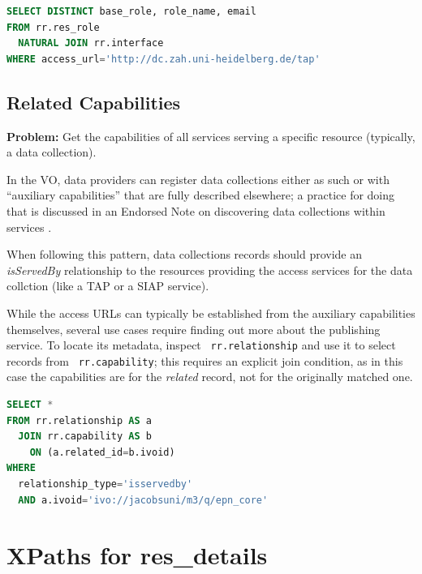 \documentclass[11pt,a4paper]{ivoa}
\newcommand{\rtent}[1]{\texttt{\color{rtcolor} #1}}
\begin{document}
\begin{lstlisting}[language=SQL,flexiblecolumns=true]
SELECT DISTINCT base_role, role_name, email 
FROM rr.res_role 
  NATURAL JOIN rr.interface 
WHERE access_url='http://dc.zah.uni-heidelberg.de/tap'
\end{lstlisting}

\subsection{Related Capabilities}

\textbf{Problem:} Get the capabilities of all services serving a
specific resource (typically, a data collection).

In the VO, data providers can register data collections either as such
or with ``auxiliary capabilities'' that are fully described elsewhere; a
practice for doing that is discussed in an Endorsed Note on discovering
data collections within services \citep{TODO}.

When following this pattern, data collections records should provide an
\emph{isServedBy} relationship to the resources providing the access
services for the data collction (like a TAP or a SIAP service).

While the access URLs can typically be established from the auxiliary
capabilities themselves, several use cases require finding out more
about the publishing service.  To locate its metadata, inspect
\rtent{rr.relationship} and use it to select records
from 
\rtent{rr.capability}; this requires an explicit join condition, as in
this case the capabilities are for the \emph{related} record, not for
the originally matched one.

\begin{lstlisting}[language=SQL,flexiblecolumns=true]
SELECT * 
FROM rr.relationship AS a
  JOIN rr.capability AS b 
    ON (a.related_id=b.ivoid) 
WHERE 
  relationship_type='isservedby'
  AND a.ivoid='ivo://jacobsuni/m3/q/epn_core'
\end{lstlisting}




\appendix

\section{XPaths for res\_details}

\label{d_u_list}
\end{document}
